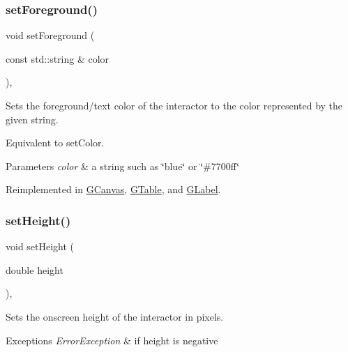 \subsubsection{\texorpdfstring{set\+Foreground()}{setForeground()}\hspace{0.1cm}{\footnotesize\ttfamily [2/2]}}
{\footnotesize\ttfamily void set\+Foreground (\begin{DoxyParamCaption}\item[{const std\+::string \&}]{color }\end{DoxyParamCaption})\hspace{0.3cm}{\ttfamily [virtual]}, {\ttfamily [inherited]}}



Sets the foreground/text color of the interactor to the color represented by the given string. 

Equivalent to set\+Color. 
\begin{DoxyParams}{Parameters}
{\em color} & a string such as \char`\"{}blue\char`\"{} or \char`\"{}\#7700ff\char`\"{} \\
\hline
\end{DoxyParams}


Reimplemented in \mbox{\hyperlink{classGCanvas_a8afbcf1f47750fb4c717f9ff36540235}{G\+Canvas}}, \mbox{\hyperlink{classGTable_a8afbcf1f47750fb4c717f9ff36540235}{G\+Table}}, and \mbox{\hyperlink{classGLabel_a8afbcf1f47750fb4c717f9ff36540235}{G\+Label}}.

\mbox{\label{classGInteractor_a9e280bfc4544dfaf8e4376c4e1a74357}} 
\subsubsection{\texorpdfstring{set\+Height()}{setHeight()}}
{\footnotesize\ttfamily void set\+Height (\begin{DoxyParamCaption}\item[{double}]{height }\end{DoxyParamCaption})\hspace{0.3cm}{\ttfamily [virtual]}, {\ttfamily [inherited]}}



Sets the onscreen height of the interactor in pixels. 


\begin{DoxyExceptions}{Exceptions}
{\em Error\+Exception} & if height is negative \\
\hline
\end{DoxyExceptions}


